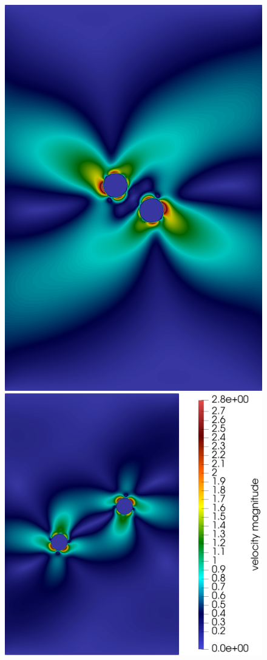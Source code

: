 \documentclass[graybox]{svmult}
\begin{document}
\begin{figure}
	\includegraphics[scale=0.14]{img-squirmer-t=3.5.png}
	\includegraphics[scale=0.14]{img-squirmer-t=8_.png}


\end{figure}
\end{document}

